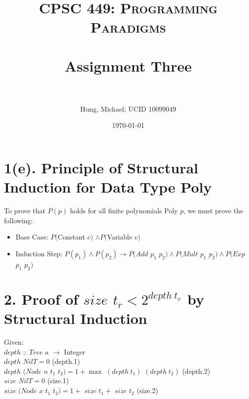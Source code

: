 \documentclass[paper=a4, fontsize=11pt]{scrartcl} %
\title{	
\normalfont \normalsize 
\textsc{CPSC 449: Programming Paradigms} \\ [25pt] %
\horrule{0.5pt} \\[0.4cm] %
\huge Assignment Three \\ %
\horrule{2pt} \\[0.5cm] %
}
\author{Hung, Michael; UCID 10099049} %
\date{\normalsize\today} %
\numberwithin{equation}{section} %
\numberwithin{figure}{section} %
\numberwithin{table}{section} %
\begin{document}
\maketitle %


\section*{1(e). Principle of Structural Induction for Data Type Poly}

To prove that $P(p)$ holds for all finite polynomials Poly $p$, we must prove the following:\\
\begin{itemize}
\item Base Case: $P($Constant $c)$ $\wedge P($Variable $v)$
\item Induction Step: $P(p_1) \wedge P(p_2) \rightarrow P(Add$ $p_1$ $p_2) \wedge P(Mult$ $p_1$ $p_2) \wedge P(Exp$ $p_1$ $p_2)$

\end{itemize}

\section*{2. Proof of $size$ $t_r < 2^{depth \hspace{3pt} t_r}$ by Structural Induction}

Given:\\

$depth$ :: $Tree$ $a$ $\rightarrow$ Integer\\
$depth$ $NilT = 0$ \hspace{300pt}(depth.1)\\
$depth$ $(Node$ $n$ $t_1$ $t_2) = 1 + \max$ $(depth\hspace{3pt} t_1)$ $(depth\hspace{3pt} t_2)$   \hspace{132pt} (depth.2)\\

$size$ $NilT = 0$  \hspace{312pt}(size.1)\\
$size$ $(Node$ $x$ $t_1$ $t_2)= 1 +$ $size$ $t_1 +$ $size$ $t_2$ \hspace{192pt}(size.2)\\
\end{document}
